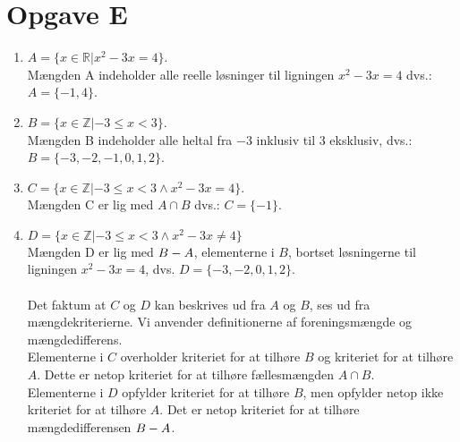 \section*{Opgave E}

\begin{enumerate}
    \item $A=\{x \in \mathbb{R} | x^2 - 3x = 4 \}$.\\
    Mængden A indeholder alle reelle løsninger til ligningen $x^2-3x=4$ dvs.: $A = \{-1,4\}$.
    
    \item $B=\{x\in \mathbb{Z}|-3 \leq x < 3\}$. \\
    Mængden B indeholder alle heltal fra $-$3 inklusiv til
3 eksklusiv, dvs.: $B=\{-3, -2, -1, 0, 1, 2\}$.

    \item $C = \{ x \in \mathbb{Z} | -3 \leq x < 3 \wedge x^2-3x=4 \}$. \\
    Mængden C er lig med $A \cap B$ dvs.: $C = \{ -1 \}$.
    
    \item $D = \{ x \in \mathbb{Z} | -3 \leq x < 3 \wedge x^2-3x \neq 4 \}$ \\
    Mængden D er lig med $B \-- A$, elementerne i $B$, bortset løsningerne til ligningen $x^2-3x=4$, dvs. $D = \{ -3, -2, 0, 1, 2 \}$. \\
    \\
    
    Det faktum at $C$ og $D$ kan beskrives ud fra $A$ og $B$, ses ud fra mængdekriterierne. Vi anvender definitionerne af foreningsmængde og mængdedifferens. \\
    Elementerne i $C$ overholder kriteriet for at tilhøre $B$ og kriteriet for at tilhøre $A$. Dette er netop kriteriet for at tilhøre fællesmængden $A \cap B$.\\ Elementerne i $D$ opfylder kriteriet for at tilhøre $B$, men opfylder netop ikke kriteriet for at tilhøre $A$. Det er netop kriteriet for at tilhøre mængdedifferensen $B \-- A$.
    
\end{enumerate}